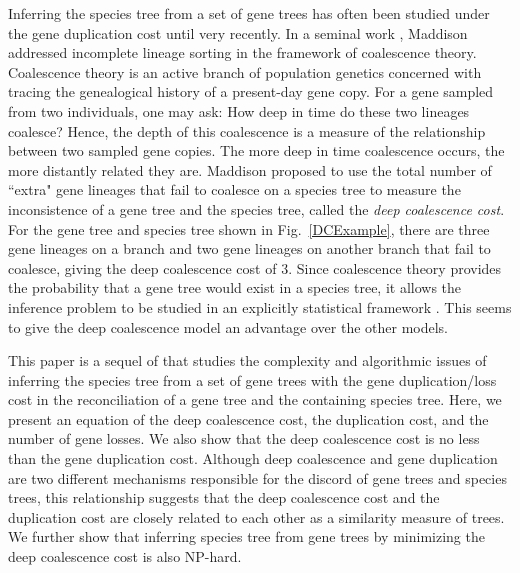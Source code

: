 \documentclass[9.5pt,journal,letterpaper,compsoc]{IEEEtran}
\begin{document}
Inferring the species tree from a set of gene trees has often been
studied under the gene duplication cost \cite{Bansal_TCBB_08,
Chauve_JCB_08, Chen_JCB_00, Durand_JCB_06, Eulenstein_JCB_98,
Hallett_Recomb00, Hadas_JCB_09, Luo_TCBB_10, Roth_JExpZool_07,Zh97}
until very recently. In a seminal work \cite{Maddison_SysBiol_97},
Maddison addressed incomplete lineage sorting in the framework of
coalescence theory. Coalescence theory is an active branch of
population genetics concerned with tracing the genealogical history
of a present-day gene copy. For a gene sampled from two individuals,
one may ask: How deep in time do these two lineages coalesce? Hence,
the depth of this coalescence is  a measure of the relationship
between two sampled gene copies. The more deep in time coalescence
occurs, the more distantly related they are.  Maddison proposed to
use the total number of ``extra" gene lineages that fail to coalesce
on a species tree
 to measure the inconsistence of a gene tree and the species tree,
called the {\it deep coalescence cost}. For the gene tree and
species tree shown in Fig.~\ref{DCExample},  there are three gene
lineages
 on a branch and two gene lineages on  another branch
that fail to coalesce, giving the deep coalescence cost of 3.
 Since coalescence
theory provides the probability that a gene tree would exist in a
species tree, it allows the inference problem to be studied in an
explicitly statistical framework \cite{Degan_Evol_05,
Rosenberg_TheorPopBiol_2002}. This seems to give the deep
coalescence model an advantage over the other models.


This paper is a sequel of \cite{Ma_SIAMComput_01} that studies the
complexity and algorithmic issues of inferring the species tree from
a set of gene trees with the gene duplication/loss cost in the
reconciliation of a gene tree and the containing species tree.
Here, we present an equation of the deep coalescence cost, the
duplication cost, and the number of gene losses. We also show that
the deep coalescence cost is  no less than  the gene duplication
cost. Although deep coalescence and gene duplication are two
different mechanisms responsible for the discord of gene trees and
species trees, this relationship suggests that the deep coalescence
cost and the duplication cost are closely related to each other as a
similarity measure of trees. We further show that inferring species
tree from gene trees by minimizing the deep coalescence cost is also NP-hard.
\end{document}
